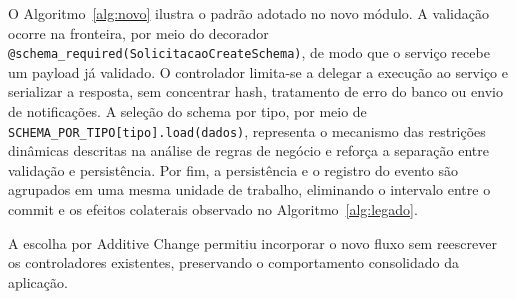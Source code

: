O Algoritmo~\ref{alg:novo} ilustra o padrão adotado no novo módulo. A validação ocorre na fronteira, por meio do decorador \texttt{@schema\_required(SolicitacaoCreateSchema)}, de modo que o serviço recebe um payload já validado. O controlador limita-se a delegar a execução ao serviço e serializar a resposta, sem concentrar hash, tratamento de erro do banco ou envio de notificações. A seleção do schema por tipo, por meio de \texttt{SCHEMA\_POR\_TIPO[tipo].load(dados)}, representa o mecanismo das restrições dinâmicas descritas na análise de regras de negócio e reforça a separação entre validação e persistência. Por fim, a persistência e o registro do evento são agrupados em uma mesma unidade de trabalho, eliminando o intervalo entre o commit e os efeitos colaterais observado no Algoritmo~\ref{alg:legado}.

A escolha por Additive Change permitiu incorporar o novo fluxo sem reescrever os controladores existentes, preservando o comportamento consolidado da aplicação.
